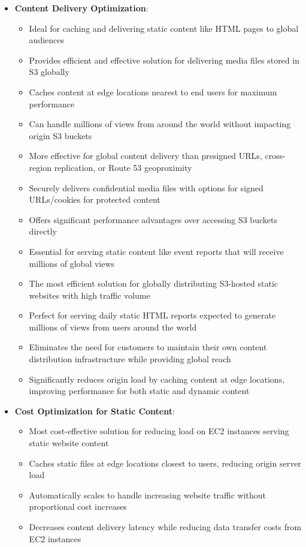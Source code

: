 \documentclass[11pt,a4paper]{report}
\begin{document}
\begin{itemize}
  \item \textbf{Content Delivery Optimization}:
\begin{itemize}
  \item Ideal for caching and delivering static content like HTML pages to global audiences
  \item Provides efficient and effective solution for delivering media files stored in S3 globally
  \item Caches content at edge locations nearest to end users for maximum performance
  \item Can handle millions of views from around the world without impacting origin S3 buckets
  \item More effective for global content delivery than presigned URLs, cross-region replication, or Route 53 geoproximity
  \item Securely delivers confidential media files with options for signed URLs/cookies for protected content
  \item Offers significant performance advantages over accessing S3 buckets directly
  \item Essential for serving static content like event reports that will receive millions of global views
  \item The most efficient solution for globally distributing S3-hosted static websites with high traffic volume
  \item Perfect for serving daily static HTML reports expected to generate millions of views from users around the world
  \item Eliminates the need for customers to maintain their own content distribution infrastructure while providing global reach
  \item Significantly reduces origin load by caching content at edge locations, improving performance for both static and dynamic content
\end{itemize}
  \item \textbf{Cost Optimization for Static Content}:
\begin{itemize}
  \item Most cost-effective solution for reducing load on EC2 instances serving static website content
  \item Caches static files at edge locations closest to users, reducing origin server load
  \item Automatically scales to handle increasing website traffic without proportional cost increases
  \item Decreases content delivery latency while reducing data transfer costs from EC2 instances

\end{itemize}
\end{itemize}
\end{document}
